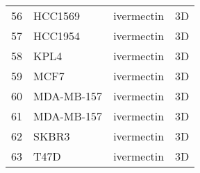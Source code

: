 \begin{tabular}{llll}
56 &     HCC1569 &    ivermectin &          3D \\
57 &     HCC1954 &    ivermectin &          3D \\
58 &        KPL4 &    ivermectin &          3D \\
59 &        MCF7 &    ivermectin &          3D \\
60 &  MDA-MB-157 &    ivermectin &          3D \\
61 &  MDA-MB-157 &    ivermectin &          3D \\
62 &       SKBR3 &    ivermectin &          3D \\
63 &        T47D &    ivermectin &          3D \\
\bottomrule
\end{tabular}
